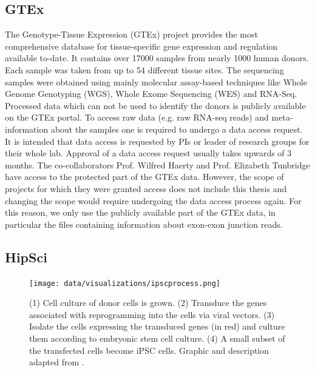 \subsection{GTEx} \label{subsec:gtex}
The Genotype-Tissue Expression (GTEx) project provides the most comprehensive database for tissue-specific gene expression and regulation available to-date. It contains over 17000 samples from nearly 1000 human donors. Each sample was taken from up to 54 different tissue sites. The sequencing samples were obtained using mainly molecular assay-based techniques like Whole Genome Genotyping (WGS), Whole Exome Sequencing (WES) and RNA-Seq.
Processed data which can not be used to identify the donors is publicly available on the GTEx portal. To access raw data (e.g. raw RNA-seq reads) and meta-information about the samples one is required to undergo a data access request. It is intended that data access is requested by PIs or leader of research groups for their whole lab. Approval of a data access request usually takes upwards of 3 months. The co-collaborators Prof. Wilfred Haerty and Prof. Elizabeth Tunbridge have access to the protected part of the GTEx data. However, the scope of projects for which they were granted access does not include this thesis and changing the scope would require undergoing the data access process again. For this reason, we only use the publicly available part of the GTEx data, in particular the files containing information about exon-exon junction reads.
\subsection{HipSci} \label{subsec:hipsci}

\begin{figure}
	\centering\texttt{[image: data/visualizations/ipscprocess.png]} 
	\caption[test.]{
	(1) Cell culture of donor cells is grown. (2) Transduce the genes associated with reprogramming into the cells via viral vectors. (3) Isolate the cells expressing the transduced genes (in red) and culture them according to embryonic stem cell culture. (4) A small subset of the transfected cells become iPSC cells. Graphic and description adapted from \cite{ipscprocess}.
}
	\label{fig:ipscprocess}
\end{figure}

